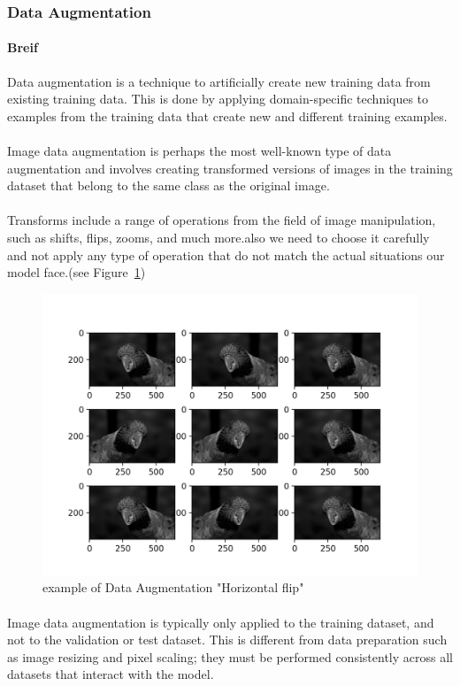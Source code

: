 \subsubsection{Data Augmentation}
\paragraph{Breif}
Data augmentation is a technique to artificially create new training data from existing training data. This is done by applying domain-specific techniques to examples from the training data that create new and different training examples.
\paragraph{}
Image data augmentation is perhaps the most well-known type of data augmentation and involves creating transformed versions of images in the training dataset that belong to the same class as the original image.
\paragraph{}
Transforms include a range of operations from the field of image manipulation, such as shifts, flips, zooms, and much more.also we need to choose it carefully and not apply any type of operation that do not match the actual situations our model face.(see Figure~\ref{fig:data_augmentation})
\begin{figure}
	\centering
	\includegraphics[width=1\textwidth]{images/data_aug.jpg}
	\caption{example of Data Augmentation "Horizontal flip"}
	\label{fig:data_augmentation}
\end{figure} 
\paragraph{}
Image data augmentation is typically only applied to the training dataset, and not to the validation or test dataset. This is different from data preparation such as image resizing and pixel scaling; they must be performed consistently across all datasets that interact with the model.





